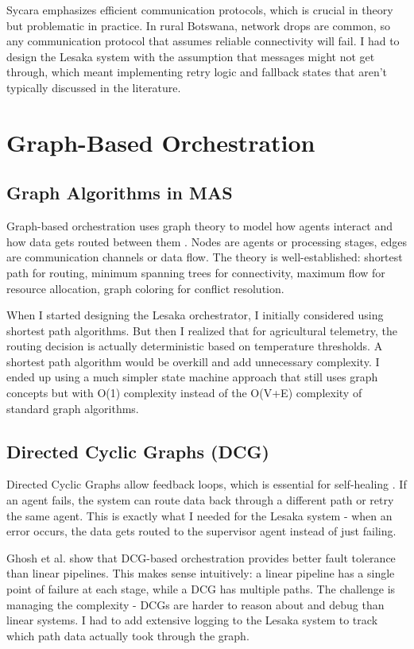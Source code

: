 Sycara \cite{sycara1998multiagent} emphasizes efficient communication protocols, which is crucial in theory but problematic in practice. In rural Botswana, network drops are common, so any communication protocol that assumes reliable connectivity will fail. I had to design the Lesaka system with the assumption that messages might not get through, which meant implementing retry logic and fallback states that aren't typically discussed in the literature.

\section{Graph-Based Orchestration}

\subsection{Graph Algorithms in MAS}

Graph-based orchestration uses graph theory to model how agents interact and how data gets routed between them \cite{diest2010graph}. Nodes are agents or processing stages, edges are communication channels or data flow. The theory is well-established: shortest path for routing, minimum spanning trees for connectivity, maximum flow for resource allocation, graph coloring for conflict resolution.

When I started designing the Lesaka orchestrator, I initially considered using shortest path algorithms. But then I realized that for agricultural telemetry, the routing decision is actually deterministic based on temperature thresholds. A shortest path algorithm would be overkill and add unnecessary complexity. I ended up using a much simpler state machine approach that still uses graph concepts but with O(1) complexity instead of the O(V+E) complexity of standard graph algorithms.

\subsection{Directed Cyclic Graphs (DCG)}

Directed Cyclic Graphs allow feedback loops, which is essential for self-healing \cite{ghosh2007self}. If an agent fails, the system can route data back through a different path or retry the same agent. This is exactly what I needed for the Lesaka system - when an error occurs, the data gets routed to the supervisor agent instead of just failing.

Ghosh et al. \cite{ghosh2007self} show that DCG-based orchestration provides better fault tolerance than linear pipelines. This makes sense intuitively: a linear pipeline has a single point of failure at each stage, while a DCG has multiple paths. The challenge is managing the complexity - DCGs are harder to reason about and debug than linear systems. I had to add extensive logging to the Lesaka system to track which path data actually took through the graph.

